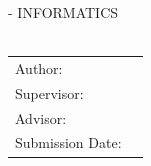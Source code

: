 \begin{titlepage}
  \centering

  \oTUM{38mm}

  \vspace{5mm}
  {\huge\MakeUppercase{\getFaculty{} - Informatics}}\\

  \vspace{5mm}
  {\large\MakeUppercase{\getUniversity{}}}\\

  \vspace{20mm}
  {\Large \getDoctype{}}

  \vspace{15mm}
  {\huge\bfseries \getTitle{}}

  \vspace{10mm}
  {\huge\bfseries \getTitleGer{}}

  \vspace{10mm}
  \begin{tabular}{l l}
    Author: & \getAuthor{} \\
    Supervisor: & \getSupervisor{} \\
    Advisor: & \getAdvisor{} \\
    Submission Date: & \getSubmissionDate{} \\
  \end{tabular}

\end{titlepage}
\cleardoublepage{}
